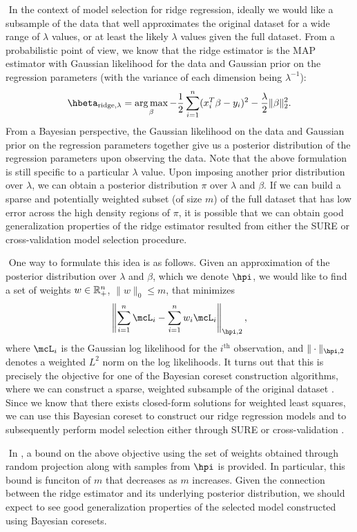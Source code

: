 $ $\newline
In the context of model selection for ridge regression, ideally we would like a subsample of the data that well approximates the original dataset for a wide range of $\lambda$ values, or at least the likely $\lambda$ values given the full dataset. From a probabilistic point of view, we know that the ridge estimator is the MAP estimator with Gaussian likelihood for the data and Gaussian prior on the regression parameters (with the variance of each dimension being $\lambda^{-1}$):
\[
\hbeta_{\text{ridge},\lambda} = \argmax_{\beta} -\frac{1}{2}\sum_{i=1}^n (x_i^T\beta - y_i)^2 - \frac{\lambda}{2}\|\beta\|_2^2.
\]
From a Bayesian perspective, the Gaussian likelihood on the data and Gaussian prior on the regression parameters together give us a posterior distribution of the regression parameters upon observing the data. Note that the above formulation is still specific to a particular $\lambda$ value. Upon imposing another prior distribution over $\lambda$, we can obtain a posterior distribution $\pi$ over $\lambda$ and $\beta$. If we can build a sparse and potentially weighted subset (of size $m$) of the full dataset that has low error across the high density regions of $\pi$, it is possible that we can obtain good generalization properties of the ridge estimator resulted from either the SURE or cross-validation model selection procedure.

$ $\newline
One way to formulate this idea is as follows. Given an approximation of the posterior distribution over $\lambda$ and $\beta$, which we denote $\hpi$, we would like to find a set of weights $w \in\mathbb{R}_+^n$, $\|w\|_0 \leq m$, that minimizes
\[
\left\| \sum_{i=1}^n \mcL_i - \sum_{i=1}^n w_i \mcL_i \right\|_{\hpi, 2},
\]
where $\mcL_i$ is the Gaussian log likelihood for the $i^\text{th}$ observation, and $\|\cdot\|_{\hpi, 2}$ denotes a weighted $L^2$ norm on the log likelihoods. It turns out that this is precisely the objective for one of the Bayesian coreset construction algorithms, where we can construct a sparse, weighted subsample of the original dataset \citep{campbell2019automated}. Since we know that there exists closed-form solutions for weighted least squares, we can use this Bayesian coreset to construct our ridge regression models and to subsequently perform model selection either through SURE or cross-validation \citep{strutz2011data}.

$ $\newline
In \citet{campbell2019automated}, a bound on the above objective using the set of weights obtained through random projection \citep{rahimi2007random} along with samples from $\hpi$ is provided. In particular, this bound is funciton of $m$ that decreases as $m$ increases. Given the connection between the ridge estimator and its underlying posterior distribution, we should expect to see good generalization properties of the selected model constructed using Bayesian coresets.

